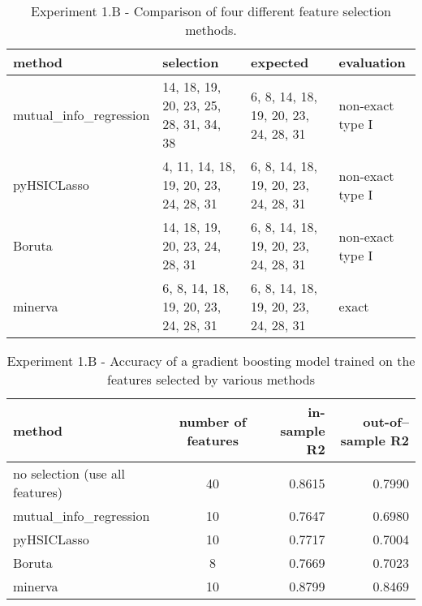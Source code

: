 \begin{table}
	\centering
{
	\begin{tabular}{l|l|l|l}
		\textbf{method}
		&
		\textbf{selection}
		&
		\textbf{expected}
		&
		\textbf{evaluation}
		\\
		\hline
		mutual\_info\_regression
		&
		\tiny{
		14, 18, 19, 20, 23, 25, 28, 31, 34, 38
	}
		& 
		\tiny{
		6, 8, 14, 18, 19, 20, 23, 24, 28, 31
	}
		&
		non-exact type I
		\\
		pyHSICLasso
		&
		\tiny{
		4, 11, 14, 18, 19, 20, 23, 24, 28, 31
	}
		& 
		\tiny{
		6, 8, 14, 18, 19, 20, 23, 24, 28, 31
	}
		&
		non-exact type I
		\\
		Boruta
		&
		\tiny{
		14, 18, 19, 20, 23, 24, 28, 31
	}
		& 
		\tiny{
		6, 8, 14, 18, 19, 20, 23, 24, 28, 31
	}
		&
		non-exact type I
		\\
		minerva
		& 
		\tiny{
		6, 8, 14, 18, 19, 20, 23, 24, 28, 31
	}
		&
		\tiny{
		6, 8, 14, 18, 19, 20, 23, 24, 28, 31
	}
		&
		exact
	\end{tabular}
}
\caption{Experiment 1.B - Comparison of four different feature selection methods.}
\label{tab.experiment1B}
\end{table}


\begin{table}
	\centering
{
	\begin{tabular}{l|c|r|r}
		\textbf{method}
		&
		\textbf{number of features}
		&
		\textbf{in-sample R2}
		&
		\textbf{out-of--sample R2}
		\\
		\hline
		no selection (use all features)
		&
		40
		&
		0.8615
		&
		0.7990
		\\
		mutual\_info\_regression
		&
		10
		&
		0.7647
		& 
		0.6980
		\\
		pyHSICLasso
		&
		10
		& 
		0.7717
		&
		0.7004
		\\
		Boruta
		&
		8
		& 
		0.7669
		&
		0.7023
		\\
		minerva
		& 
		10
		&
		0.8799
		&
		0.8469
	\end{tabular}
}
\caption{Experiment 1.B - Accuracy of a gradient boosting model trained on the features selected by various methods}
\label{tab.experiment1Baccuracy}
\end{table}

